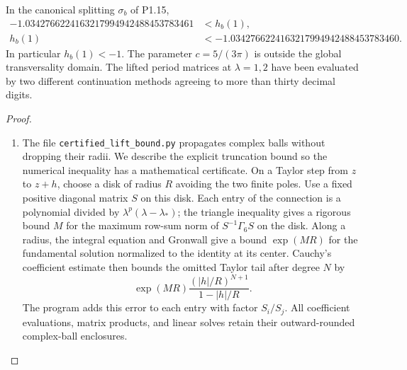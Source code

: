 \begin{theorem}\label{night:P1.16}
In the canonical splitting $\sigma_b$ of P1.15,
\[
\begin{aligned}
-1.0342766224163217994942488453783461&<h_b(1),\\
h_b(1)&<-1.0342766224163217994942488453783460.
\end{aligned}
\]
In particular $h_b(1)<-1$.  The parameter $c=5/(3\pi)$ is outside the
global transversality domain.  The lifted period matrices at
$\lambda=1,2$ have been evaluated by two different continuation methods
agreeing to more than thirty decimal digits.
\end{theorem}
\begin{proof}
\begin{enumerate}[label=\arabic*.]
\item The file \texttt{certified\_lift\_bound.py} propagates complex balls
without dropping their radii.  We describe the explicit truncation
bound so the numerical inequality has a mathematical certificate.
On a Taylor step from $z$ to $z+h$, choose a disk of radius $R$ avoiding
the two finite poles.  Use a fixed positive diagonal matrix $S$ on
this disk.  Each entry of the connection is a polynomial divided by
$\lambda^p(\lambda-\lambda_*)$; the triangle inequality gives a
rigorous bound $M$ for the maximum row-sum norm of
$S^{-1}\Gamma_6S$ on the disk.  Along a radius, the integral equation
and Gronwall give a bound $\exp(MR)$ for the fundamental solution
normalized to the identity at its center.  Cauchy's coefficient
estimate then bounds the omitted Taylor tail after degree $N$ by
\[
\exp(MR)\frac{(|h|/R)^{N+1}}{1-|h|/R}.
\tag{1.16.1}
\]
The program adds this error to each entry with factor $S_i/S_j$.
All coefficient evaluations, matrix products, and linear solves retain
their outward-rounded complex-ball enclosures.


\end{enumerate}
\end{proof}
